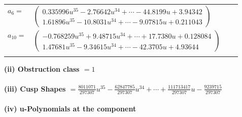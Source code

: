 \documentclass[1p]{elsarticle_modified}
\theoremstyle{definition}
\begin{document}
\begin{tabular}{m{7pt} m{180pt} m{7pt} m{180pt} }
\flushright $a_{6}=$&$\begin{pmatrix}0.335996 u^{35}-2.76642 u^{34}+\cdots-44.8199 u+3.94342\\1.61896 u^{35}-10.8031 u^{34}+\cdots-9.07815 u+0.211043\end{pmatrix}$ \\
\flushright $a_{10}=$&$\begin{pmatrix}-0.768259 u^{35}+9.48715 u^{34}+\cdots+17.7380 u+0.128084\\1.47681 u^{35}-9.34615 u^{34}+\cdots-42.3705 u+4.93644\end{pmatrix}$\\&\end{tabular}
\flushleft \textbf{(ii) Obstruction class $= 1$}\\~\\
\flushleft \textbf{(iii) Cusp Shapes $= \frac{8011071}{297307} u^{35}-\frac{62847785}{297307} u^{34}+\cdots+\frac{111713417}{297307} u-\frac{9239715}{297307}$}\\~\\
\newpage\renewcommand{\arraystretch}{1}
\flushleft \textbf{(iv) u-Polynomials at the component}\newline \\
\end{document}
